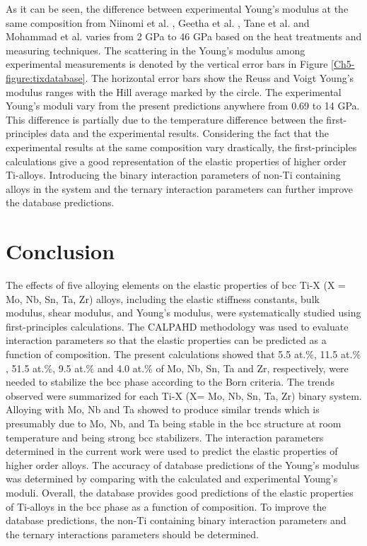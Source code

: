 As it can be seen, the difference between experimental Young's modulus at the same composition from Niinomi et al. \cite{Niinomi2012}, Geetha et al. \cite{Geetha2009}, Tane et al. \cite{Tane2010a} and Mohammad et al. \cite{Mohammed2014} varies from 2 GPa to 46 GPa based on the heat treatments and measuring techniques. The scattering in the Young's modulus among experimental measurements is denoted by the vertical error bars in Figure \ref{Ch5-figure:tixdatabase}. The horizontal error bars show the Reuss and Voigt Young's modulus ranges with the Hill average marked by the circle. The experimental Young's moduli vary from the present predictions anywhere from 0.69 to 14 GPa. This difference is partially due to the temperature difference between the first-principles data and the experimental results. Considering the fact that the experimental results at the same composition vary drastically, the first-principles calculations give a good representation of the elastic properties of higher order Ti-alloys. Introducing the binary interaction parameters of non-Ti containing alloys in the system and the ternary interaction parameters can further improve the database predictions.

\section{Conclusion}

The effects of five alloying elements on the elastic properties of bcc Ti-X (X = Mo, Nb, Sn, Ta, Zr) alloys, including the elastic stiffness constants, bulk modulus, shear modulus, and Young's modulus, were systematically studied using first-principles calculations. The CALPAHD methodology was used to evaluate interaction parameters so that the elastic properties can be predicted as a function of composition. The present calculations showed that 5.5 at.$\%$, 11.5 at.$\%$, 51.5 at.$\%$, 9.5 at.$\%$ and 4.0 at.$\%$ of Mo, Nb, Sn, Ta and Zr, respectively, were needed to stabilize the bcc phase according to the Born criteria. The trends observed were summarized for each Ti-X (X= Mo, Nb, Sn, Ta, Zr) binary system. Alloying with Mo, Nb and Ta showed to produce similar trends which is presumably due to Mo, Nb, and Ta being stable in the bcc structure at room temperature and being strong bcc stabilizers. The interaction parameters determined in the current work were used to predict the elastic properties of higher order alloys. The accuracy of database predictions of the Young's modulus was determined by comparing with the calculated and experimental Young's moduli. Overall, the database provides good predictions of the elastic properties of Ti-alloys in the bcc phase as a function of composition. To improve the database predictions, the non-Ti containing binary interaction parameters and the ternary interactions parameters should be determined.

